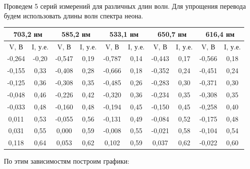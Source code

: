 \documentclass[12pt,a4paper]{article}
\begin{document}
Проведем 5 серий измерений для различных длин волн. Для упрощения перевода будем использовать длины волн спектра неона.

\begin{center}
\begin{tabular}{|c|c|c|c|c|c|c|c|c|c|}
\hline 
\multicolumn{2}{|c|}{703,2 нм} & \multicolumn{2}{|c|}{585,2 нм} & \multicolumn{2}{|c|}{533,1 нм} & \multicolumn{2}{|c|}{650,7 нм} &  \multicolumn{2}{|c|}{616,4 нм} \\ 
\hline 
V, В & I, у.е. & V, В & I, у.е. & V, В & I, у.е. & V, В & I, у.е. & V, В & I, у.е. \\ 
\hline 
-0,264 & -0,20 & -0,547 & 0,19 & -0,787 & 0,14 & -0,443 & 0,17 & -0,566 & 0,18 \\ 
\hline 
-0,155 & 0,33 & -0,408 & 0,28 & -0,666 & 0,18 & -0,352 & 0,24 & -0,451 & 0,24 \\ 
\hline 
-0,125 & 0,36 & -0,308 & 0,35 & -0,485 & 0,26 & -0,283 & 0,30 & -0,371 & 0,30 \\ 
\hline 
-0,048 & 0,46 & -0,226 & 0,42 & -0,320 & 0,36 & -0,234 & 0,35 & -0,308 & 0,35 \\ 
\hline 
-0,033 & 0,48 & -0,160 & 0,48 & -0,194 & 0,45 & -0,150 & 0,45 & -0,258 & 0,40 \\ 
\hline 
0,011 & 0,53 & -0,055 & 0,56 & -0,131 & 0,49 & -0,084 & 0,52 & -0,175 & 0,48 \\ 
\hline 
0,031 & 0,55 & 0,000 & 0,59 & -0,008 & 0,55 & -0,021 & 0,58 & -0,104 & 0,54 \\ 
\hline 
0,118 & 0,64 & 0,053 & 0,62 & 0,102 & 0,59 & 0,037 & 0,62 & -0,022 & 0,60 \\ 
\hline 
\end{tabular} 
\end{center}

По этим зависимостям построим графики: 
\end{document}
